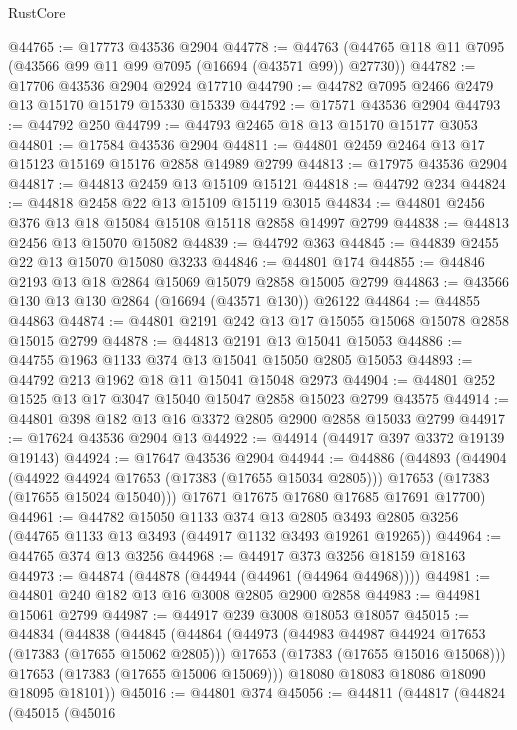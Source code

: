 \begin{lexlean}{RustCore}
\begin{coremodule}
@44765 := @17773 @43536 @2904
@44778 := @44763 (@44765 @118 @11 @7095 (@43566 @99 @11 @99 @7095 (@16694 (@43571 @99)) @27730))
@44782 := @17706 @43536 @2904 @2924 @17710
@44790 := @44782 @7095 @2466 @2479 @13 @15170 @15179 @15330 @15339
@44792 := @17571 @43536 @2904
@44793 := @44792 @250
@44799 := @44793 @2465 @18 @13 @15170 @15177 @3053
@44801 := @17584 @43536 @2904
@44811 := @44801 @2459 @2464 @13 @17 @15123 @15169 @15176 @2858 @14989 @2799
@44813 := @17975 @43536 @2904
@44817 := @44813 @2459 @13 @15109 @15121
@44818 := @44792 @234
@44824 := @44818 @2458 @22 @13 @15109 @15119 @3015
@44834 := @44801 @2456 @376 @13 @18 @15084 @15108 @15118 @2858 @14997 @2799
@44838 := @44813 @2456 @13 @15070 @15082
@44839 := @44792 @363
@44845 := @44839 @2455 @22 @13 @15070 @15080 @3233
@44846 := @44801 @174
@44855 := @44846 @2193 @13 @18 @2864 @15069 @15079 @2858 @15005 @2799
@44863 := @43566 @130 @13 @130 @2864 (@16694 (@43571 @130)) @26122
@44864 := @44855 @44863
@44874 := @44801 @2191 @242 @13 @17 @15055 @15068 @15078 @2858 @15015 @2799
@44878 := @44813 @2191 @13 @15041 @15053
@44886 := @44755 @1963 @1133 @374 @13 @15041 @15050 @2805 @15053
@44893 := @44792 @213 @1962 @18 @11 @15041 @15048 @2973
@44904 := @44801 @252 @1525 @13 @17 @3047 @15040 @15047 @2858 @15023 @2799 @43575
@44914 := @44801 @398 @182 @13 @16 @3372 @2805 @2900 @2858 @15033 @2799
@44917 := @17624 @43536 @2904 @13
@44922 := @44914 (@44917 @397 @3372 @19139 @19143)
@44924 := @17647 @43536 @2904
@44944 := @44886
    (@44893
      (@44904
        (@44922 @44924 @17653 (@17383 (@17655 @15034 @2805)))
        @17653
        (@17383 (@17655 @15024 @15040)))
      @17671
      @17675
      @17680
      @17685
      @17691
      @17700)
@44961 := @44782
    @15050
    @1133
    @374
    @13
    @2805
    @3493
    @2805
    @3256
    (@44765 @1133 @13 @3493 (@44917 @1132 @3493 @19261 @19265))
@44964 := @44765 @374 @13 @3256
@44968 := @44917 @373 @3256 @18159 @18163
@44973 := @44874 (@44878 (@44944 (@44961 (@44964 @44968))))
@44981 := @44801 @240 @182 @13 @16 @3008 @2805 @2900 @2858
@44983 := @44981 @15061 @2799
@44987 := @44917 @239 @3008 @18053 @18057
@45015 := @44834
    (@44838
      (@44845
        (@44864
          (@44973
            (@44983 @44987 @44924 @17653 (@17383 (@17655 @15062 @2805)))
            @17653
            (@17383 (@17655 @15016 @15068)))
          @17653
          (@17383 (@17655 @15006 @15069)))
        @18080
        @18083
        @18086
        @18090
        @18095
        @18101))
@45016 := @44801 @374
@45056 := @44811
    (@44817
      (@44824
        (@45015
          (@45016

\end{coremodule}
\end{lexlean}
